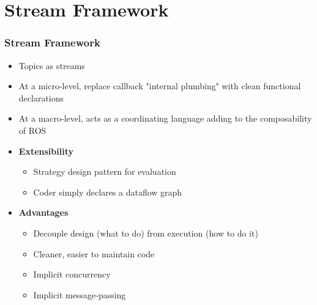 \documentclass{beamer}
\begin{document}
\section{Stream Framework}
	\begin{frame} \frametitle{Stream Framework}
		\begin{itemize}		
		\item Topics as streams
		\item At a micro-level, replace callback "internal plumbing" with clean functional declarations
		\item At a macro-level, acts as a coordinating language adding to the composability of ROS
		\item \textbf{Extensibility}
			\begin{itemize}
			\item Strategy design pattern for evaluation
			\item Coder simply declares a dataflow graph
			\end{itemize}
		\item \textbf{Advantages}
			\begin{itemize}						
			\item Decouple design (what to do) from execution (how to do it)
			\item Cleaner, easier to maintain code
			\item Implicit concurrency
			\item Implicit message-passing
			\end{itemize}
		\end{itemize}
	\end{frame}	
\end{document}
